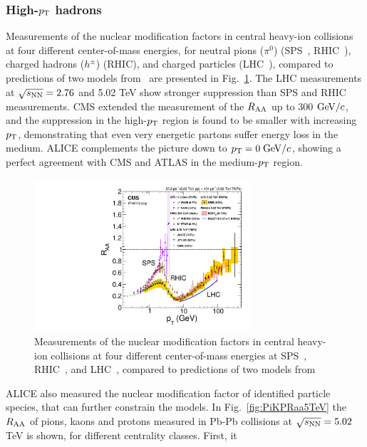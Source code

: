 \subsubsection{High-$p_{\rm T}$ hadrons}
Measurements of the nuclear modification factors in central heavy-ion 
collisions at four different center-of-mass energies, for neutral pions 
($\pi^0$) (SPS~\cite{Aggarwal:2001gn,dEnterria:2004cly,Alt:2007cd},
 RHIC~\cite{Adare:2012wg}),
 charged hadrons ($h^{\pm}$) (RHIC\cite{Adams:2003kv}), and
  charged particles (LHC~\cite{Abelev:2012hxa,Aad:2015wga,CMS:2012aa}),
   compared to predictions of two models from~\cite{Chien:2015vja,Xu:2015bbz}
    are presented in Fig.~\ref{fig:CMSRaa}. The LHC measurements at
     $\sqrt{s_{\rm NN}} = 2.76$ and 5.02 TeV show stronger suppression than SPS 
     and RHIC measurements. CMS extended the measurement of the 
     $R_{\rm AA}$ up to 300 $\mathrm{GeV}/c$, and the suppression in the high-$p_{\rm T}$ 
     region is found to be smaller with increasing $p_{\rm T}$, demonstrating 
     that even very energetic partons suffer energy loss in the medium.
      ALICE complements the picture down to $p_{\rm T} = 0 \; \mathrm{GeV}/c$, 
      showing a perfect agreement with CMS and ATLAS in the medium-$p_{\rm T}$ region.
\begin{figure}[!ht]
  \centering
  \includegraphics[width=8cm]{FigCap1/CMSRaa.pdf}
  \caption{Measurements of the nuclear modification factors in central heavy-ion collisions at four different center-of-mass energies at SPS~\cite{Aggarwal:2001gn,dEnterria:2004cly,Alt:2007cd}, RHIC~\cite{Adare:2012wg,Adams:2003kv}, and LHC~\cite{Abelev:2012hxa,Aad:2015wga,CMS:2012aa}, compared to predictions of two models from~\cite{Chien:2015vja,Xu:2015bbz}}
  \label{fig:CMSRaa}
\end{figure}
ALICE also measured the nuclear modification factor of identified 
particle species, that can further constrain the models. In Fig.~\ref{fig:PiKPRaa5TeV}
 the $R_{\rm AA}$ of pions, kaons and protons measured in Pb-Pb collisions 
 at $\sqrt{s_{\rm NN}} = 5.02$ TeV is shown, for different centrality classes. First, it 
